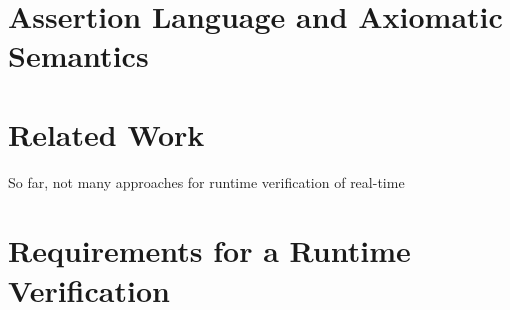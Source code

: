 \documentclass[]{llncs}
\begin{document}
\section{Assertion Language and Axiomatic Semantics}
\label{Assertion}



\section{Related Work}
\label{sec:relatedwork}


So far, not many approaches for runtime verification of real-time

\section{Requirements for a Runtime Verification}
\cite{Lakhneche:1995:MTL:202379.202389}




\end{document}
